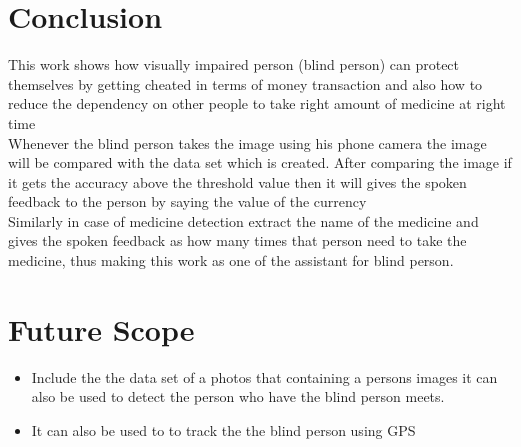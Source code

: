 \section{Conclusion}
\noindent This work shows how visually impaired person (blind person) can protect themselves by getting cheated in terms of money transaction and also how to reduce the dependency on other people to take right amount of medicine at right time\\Whenever the blind person takes the image using his phone camera the image will be compared with the data set which is created. After comparing the image if it gets the accuracy above the threshold value then it will gives the spoken feedback to the person by saying the value of the currency\\Similarly in case of medicine detection extract the name of the medicine and gives the spoken feedback as how many times that person need to take the medicine, thus making this work as one of the assistant for blind person.
\section{Future Scope}
\begin{itemize}\\
\\
\item Include the the data set of a photos that containing a persons images it can also be used to detect the person who have the blind person meets. 

\item It can also be used to to track the the blind person using GPS 

\end{itemize}



